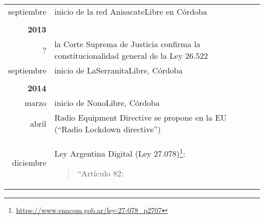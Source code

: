 \begin{longtable}{ r | p{}}
  septiembre & inicio de la red AnisacateLibre en Córdoba \\
  & \\
 \textbf{2013} & \\
 ? & la Corte Suprema de Justicia confirma la constitucionalidad general de la Ley 26.522 \\
septiembre & inicio de LaSerranitaLibre, Córdoba \\
 & \\
 \textbf{2014} & \\
marzo & inicio de NonoLibre, Córdoba \\
abril & Radio Equipment Directive se propone en la EU (``Radio Lockdown directive'') \\
diciembre & Ley Argentina Digital (Ley 27.078)\footnote{\url{https://www.enacom.gob.ar/ley-27-078_p2707}}:
\begin{quotation}
``Artículo 82:


\end{quotation}
\end{longtable}
